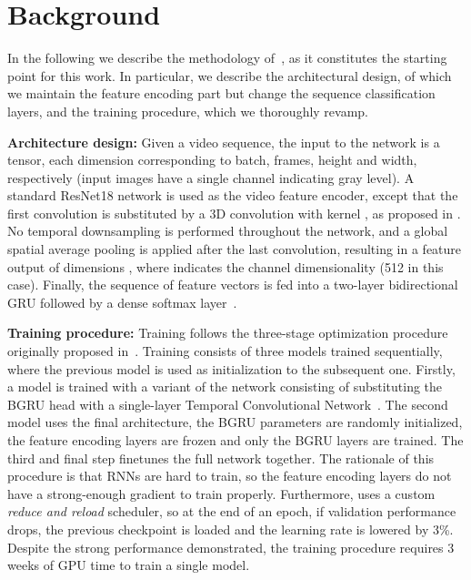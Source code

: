 \documentclass{article}
\begin{document}
\section{Background}

In the following we describe the methodology of~\cite{petridis18}, as it constitutes the starting point for this work. In particular, we describe the architectural design, of which we maintain the feature encoding part but change the sequence classification layers, and the training procedure, which we thoroughly revamp.

\textbf{Architecture design:} Given a video sequence, the input to the network is a  tensor, each dimension corresponding to batch, frames, height and width, respectively (input images have a single channel indicating gray level). A standard ResNet18 network is used as the video feature encoder, except that the first convolution is substituted by a 3D convolution with kernel , as proposed in \cite{stafylakis17}. No temporal downsampling is performed throughout the network, and a global spatial average pooling is applied after the last convolution, resulting in a feature output of dimensions , where  indicates the channel dimensionality (512 in this case). Finally, the sequence of feature vectors is fed into a two-layer bidirectional GRU followed by a dense softmax layer~\cite{petridis18}. 

\textbf{Training procedure:} Training follows the three-stage optimization procedure originally proposed in~\cite{stafylakis17}. Training consists of three models trained sequentially, where the previous model is used as initialization to the subsequent one. Firstly, a model is trained with a variant of the network consisting of substituting the BGRU head with a single-layer Temporal Convolutional Network~\cite{BaiTCN2018}. The second model uses the final architecture, the BGRU parameters are randomly initialized, the feature encoding layers are frozen and only the BGRU layers are trained. The third and final step finetunes the full network together. The rationale of this procedure is that RNNs are hard to train, so the feature encoding layers do not have a strong-enough gradient to train properly. Furthermore, \cite{petridis18} uses a custom \textit{reduce and reload} scheduler, so at the end of an epoch, if validation performance drops, the previous checkpoint is loaded and the learning rate is lowered by 3\%. Despite the strong performance demonstrated, the training procedure requires 3 weeks of GPU time to train a single model.
\end{document}

